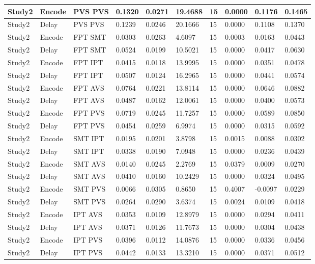 \begin{table}[!hbt]
\begin{tabular}[0.2em]{@{}llllllllll@{}}
Study2 & Encode & PVS PVS & 0.1320 & 0.0271 & 19.4688 & 15 & 0.0000 & 0.1176 & 0.1465 \\\midrule
Study2 & Delay & PVS PVS & 0.1239 & 0.0246 & 20.1666 & 15 & 0.0000 & 0.1108 & 0.1370 \\\midrule
Study2 & Encode & FPT SMT & 0.0303 & 0.0263 & 4.6097 & 15 & 0.0003 & 0.0163 & 0.0443 \\\midrule
Study2 & Delay & FPT SMT & 0.0524 & 0.0199 & 10.5021 & 15 & 0.0000 & 0.0417 & 0.0630 \\\midrule
Study2 & Encode & FPT IPT & 0.0415 & 0.0118 & 13.9995 & 15 & 0.0000 & 0.0351 & 0.0478 \\\midrule
Study2 & Delay & FPT IPT & 0.0507 & 0.0124 & 16.2965 & 15 & 0.0000 & 0.0441 & 0.0574 \\\midrule
Study2 & Encode & FPT AVS & 0.0764 & 0.0221 & 13.8114 & 15 & 0.0000 & 0.0646 & 0.0882 \\\midrule
Study2 & Delay & FPT AVS & 0.0487 & 0.0162 & 12.0061 & 15 & 0.0000 & 0.0400 & 0.0573 \\\midrule
Study2 & Encode & FPT PVS & 0.0719 & 0.0245 & 11.7257 & 15 & 0.0000 & 0.0589 & 0.0850 \\\midrule
Study2 & Delay & FPT PVS & 0.0454 & 0.0259 & 6.9974 & 15 & 0.0000 & 0.0315 & 0.0592 \\\midrule
Study2 & Encode & SMT IPT & 0.0195 & 0.0201 & 3.8798 & 15 & 0.0015 & 0.0088 & 0.0302 \\\midrule
Study2 & Delay & SMT IPT & 0.0338 & 0.0190 & 7.0948 & 15 & 0.0000 & 0.0236 & 0.0439 \\\midrule
Study2 & Encode & SMT AVS & 0.0140 & 0.0245 & 2.2769 & 15 & 0.0379 & 0.0009 & 0.0270 \\\midrule
Study2 & Delay & SMT AVS & 0.0410 & 0.0160 & 10.2429 & 15 & 0.0000 & 0.0324 & 0.0495 \\\midrule
Study2 & Encode & SMT PVS & 0.0066 & 0.0305 & 0.8650 & 15 & 0.4007 & -0.0097 & 0.0229 \\\midrule
Study2 & Delay & SMT PVS & 0.0264 & 0.0290 & 3.6374 & 15 & 0.0024 & 0.0109 & 0.0418 \\\midrule
Study2 & Encode & IPT AVS & 0.0353 & 0.0109 & 12.8979 & 15 & 0.0000 & 0.0294 & 0.0411 \\\midrule
Study2 & Delay & IPT AVS & 0.0371 & 0.0126 & 11.7673 & 15 & 0.0000 & 0.0304 & 0.0438 \\\midrule
Study2 & Encode & IPT PVS & 0.0396 & 0.0112 & 14.0876 & 15 & 0.0000 & 0.0336 & 0.0456 \\\midrule
Study2 & Delay & IPT PVS & 0.0442 & 0.0133 & 13.3210 & 15 & 0.0000 & 0.0371 & 0.0512 \\\midrule

\end{tabular}
\end{table}

